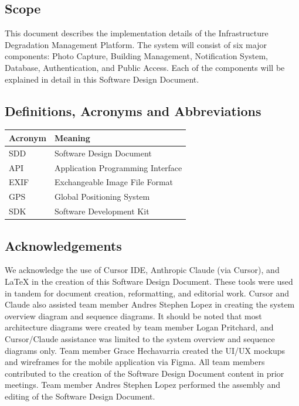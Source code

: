 \documentclass[12pt]{article}
\begin{document}
\subsection{Scope}

This document describes the implementation details of the Infrastructure Degradation Management Platform. The system will consist of six major components: Photo Capture, Building Management, Notification System, Database, Authentication, and Public Access. Each of the components will be explained in detail in this Software Design Document.

\subsection{Definitions, Acronyms and Abbreviations}

\begin{tabular}{|p{3cm}|p{10cm}|}
\hline
\textbf{Acronym} & \textbf{Meaning} \\
\hline
SDD & Software Design Document \\
API & Application Programming Interface \\
EXIF & Exchangeable Image File Format \\
GPS & Global Positioning System \\
SDK & Software Development Kit \\
\hline
\end{tabular}

\subsection{Acknowledgements}

We acknowledge the use of Cursor IDE, Anthropic Claude (via Cursor), and LaTeX in the creation of this Software Design Document. These tools were used in tandem for document creation, reformatting, and editorial work. Cursor and Claude also assisted team member Andres Stephen Lopez in creating the system overview diagram and sequence diagrams. It should be noted that most architecture diagrams were created by team member Logan Pritchard, and Cursor/Claude assistance was limited to the system overview and sequence diagrams only. Team member Grace Hechavarria created the UI/UX mockups and wireframes for the mobile application via Figma. All team members contributed to the creation of the Software Design Document content in prior meetings. Team member Andres Stephen Lopez performed the assembly and editing of the Software Design Document.
\end{document}
